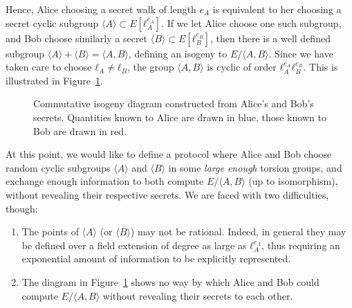 \documentclass[10pt]{article}
\theoremstyle{plain}
\theoremstyle{definition}
\newcommand{\bl}[1]{\textcolor{blue}{#1}}
\newcommand{\rd}[1]{\textcolor{red}{#1}}
\begin{document}
Hence, Alice choosing a secret walk of length $e_A$ is equivalent to
her choosing a secret cyclic subgroup $〈A〉⊂E[ℓ_A^{e_A}]$. %
If we let Alice choose one such subgroup, and Bob choose similarly a
secret $〈B〉⊂E[ℓ_B^{e_B}]$, then there is a well defined subgroup
$〈A〉+〈B〉=〈A,B〉$, defining an isogeny to $E/〈A,B〉$. %
Since we have taken care to choose $ℓ_A≠ℓ_B$, the group $〈A,B〉$ is
cyclic of order $ℓ_A^{e_A}ℓ_B^{e_B}$. %
This is illustrated in Figure~\ref{fig:sidh-diag}.

\begin{figure}
  \centering
  \caption{Commutative isogeny diagram constructed from Alice's and
    Bob's secrets. %
    Quantities known to Alice are drawn in blue, those known to Bob
    are drawn in red.}
  \label{fig:sidh-diag}
\end{figure}

At this point, we would like to define a protocol where Alice and Bob
choose random cyclic subgroups $〈A〉$ and $〈B〉$ in some \emph{large
  enough} torsion groups, and exchange enough information to both
compute $E/〈A,B〉$ (up to isomorphism), without revealing their
respective secrets. %
We are faced with two difficulties, though:
\begin{enumerate}
\item The points of $〈A〉$ (or $〈B〉$) may not be rational. %
  Indeed, in general they may be defined over a field extension of
  degree as large as $ℓ_A^{e_A}$, thus requiring an exponential amount
  of information to be explicitly represented.
\item The diagram in Figure~\ref{fig:sidh-diag} shows no way by which
  Alice and Bob could compute $E/〈A,B〉$ without revealing their
  secrets to each other.
\end{enumerate}
\end{document}
